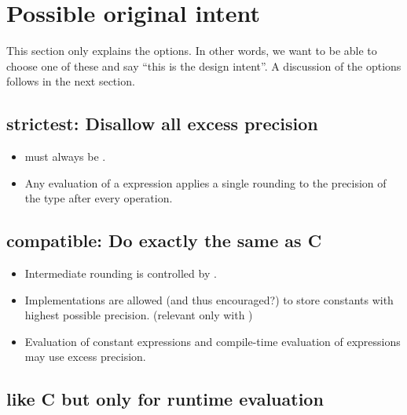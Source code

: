 \section{Possible original intent}

This section only explains the options.
In other words, we want to be able to choose one of these and say “this is the
design intent”.
A discussion of the options follows in the next section.

\subsection{strictest: Disallow all excess precision}\label{o:1}

\begin{itemize}
  \item {} must always be .

  \item Any evaluation of a \fp expression applies a single rounding to the
    precision of the \fp type after every operation.
\end{itemize}

\subsection{compatible: Do exactly the same as C}\label{o:2}

\begin{itemize}
  \item Intermediate rounding is controlled by .

  \item Implementations are allowed (and thus encouraged?) to store constants
    with highest possible precision. (relevant only with )

  \item Evaluation of constant expressions and compile-time evaluation of
    expressions may use excess precision.
\end{itemize}

\subsection{like C but only for runtime evaluation}\label{o:3}

